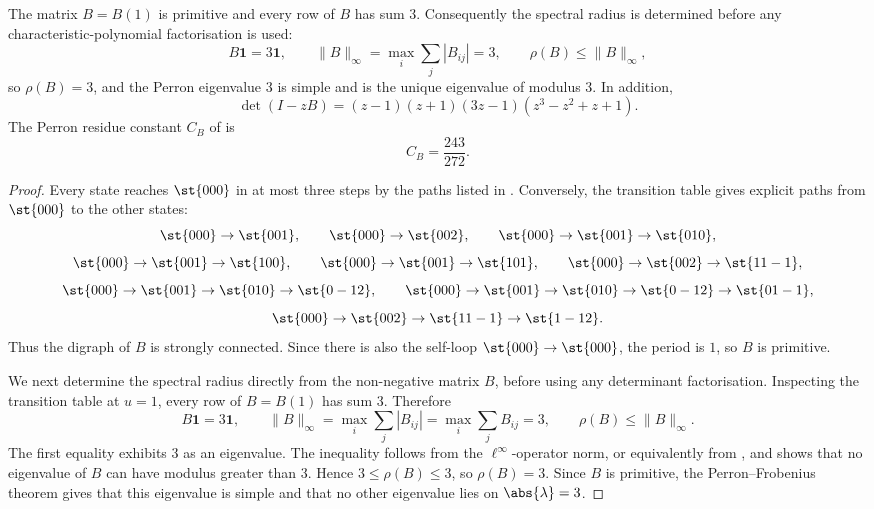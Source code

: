 \begin{proposition}
  \label{prop:sync-kernel-spectrum}
  The matrix \(B=B(1)\) is primitive and every row of \(B\) has sum
  \(3\). Consequently the spectral radius is determined before any
  characteristic-polynomial factorisation is used:
  \[
    B\mathbf 1=3\mathbf 1,\qquad
    \|B\|_\infty=\max_i\sum_j |B_{ij}|=3,\qquad
    \rho(B)\le \|B\|_\infty,
  \]
  so \(\rho(B)=3\), and the Perron eigenvalue \(3\) is simple and is
  the unique eigenvalue of modulus \(3\).
  In addition,
  \[
    \det(I-zB)=(z-1)(z+1)(3z-1)(z^3-z^2+z+1).
  \]
  The Perron residue constant \(C_B\) of
   is
  \[
    C_B=\frac{243}{272}.
  \]
\end{proposition}

\begin{proof}
Every state reaches \(\st{000}\) in at most three steps by the paths
listed in . Conversely, the transition table gives
explicit paths from \(\st{000}\) to the other states:
\[
  \st{000}\to\st{001},\qquad
  \st{000}\to\st{002},\qquad
  \st{000}\to\st{001}\to\st{010},
\]
\[
  \st{000}\to\st{001}\to\st{100},\qquad
  \st{000}\to\st{001}\to\st{101},\qquad
  \st{000}\to\st{002}\to\st{11-1},
\]
\[
  \st{000}\to\st{001}\to\st{010}\to\st{0-12},\qquad
  \st{000}\to\st{001}\to\st{010}\to\st{0-12}\to\st{01-1},
\]
\[
  \st{000}\to\st{002}\to\st{11-1}\to\st{1-12}.
\]
Thus the digraph of \(B\) is strongly connected. Since there is also the
self-loop \(\st{000}\to\st{000}\), the period is \(1\), so \(B\) is primitive.

We next determine the spectral radius directly from the non-negative
matrix \(B\), before using any determinant factorisation. Inspecting the
transition table at \(u=1\), every row of \(B=B(1)\) has sum \(3\).
Therefore
\[
  B\mathbf 1=3\mathbf 1,\qquad
  \|B\|_\infty=\max_i\sum_j |B_{ij}|=\max_i\sum_j B_{ij}=3,
  \qquad
  \rho(B)\le\|B\|_\infty.
\]
The first equality exhibits \(3\) as an eigenvalue. The inequality
follows from the \(\ell^\infty\)-operator norm, or equivalently from
, and shows that no eigenvalue of \(B\)
can have modulus greater than \(3\). Hence \(3\le\rho(B)\le3\), so
\(\rho(B)=3\). Since \(B\) is primitive, the Perron--Frobenius theorem
gives that this eigenvalue is simple and that no other eigenvalue lies
on \(\abs{\lambda}=3\).


\end{proof}
